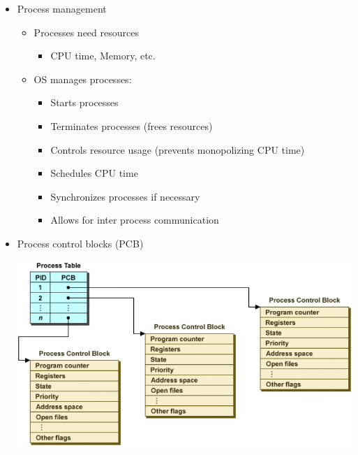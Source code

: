 \documentclass[a4paper]{article}
\begin{document}
\begin{itemize}
\begin{center}
		\end{center}
		\item Process management
			\begin{itemize}
				\item Processes need resources
					\begin{itemize}
						\item CPU time, Memory, etc.
					\end{itemize}
				\item OS manages processes:
					\begin{itemize}
						\item Starts processes
						\item Terminates processes (frees resources)
						\item Controls resource usage (prevents monopolizing CPU time)
						\item Schedules CPU time
						\item Synchronizes processes if necessary
						\item Allows for inter process communication
					\end{itemize}
			\end{itemize}
		\item Process control blocks (PCB)\\
		\begin{center}
			\includegraphics[scale=1.5]{Figures/PCB.jpg}
		\end{center}
\end{itemize}
\end{document}
